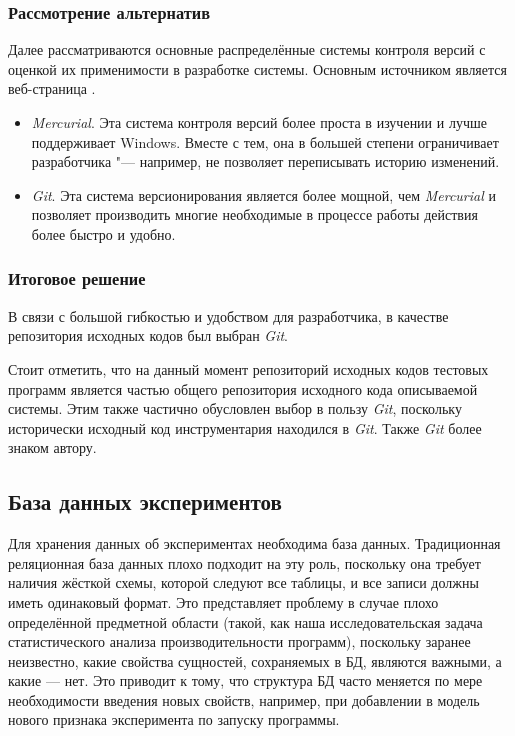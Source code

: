 \subsubsection{Рассмотрение альтернатив}
Далее рассматриваются основные распределённые системы контроля версий с оценкой их применимости в разработке системы. Основным источником является веб-страница \cite{git-vs-hg}.
\begin{itemize}
    \item \textit{Mercurial}. Эта система контроля версий более проста в изучении и лучше поддерживает Windows. Вместе с тем, она в большей степени ограничивает разработчика "--- например, не позволяет переписывать историю изменений.
    \item \textit{Git}. Эта система версионирования является более мощной, чем \textit{Mercurial} и позволяет производить многие необходимые в процессе работы действия более быстро и удобно.
\end{itemize}


\subsubsection{Итоговое решение}
В связи с большой гибкостью и удобством для разработчика, в качестве репозитория исходных кодов был выбран \textit{Git}.

Стоит отметить, что на данный момент репозиторий исходных кодов тестовых программ является частью общего репозитория исходного кода описываемой системы. Этим также частично обусловлен выбор в пользу \textit{Git}, поскольку исторически исходный код инструментария находился в \textit{Git}. Также \textit{Git} более знаком автору.


\subsection{База данных экспериментов}
Для хранения данных об экспериментах необходима база данных. Традиционная реляционная база данных плохо подходит на эту роль, поскольку она требует наличия жёсткой схемы, которой следуют все таблицы, и все записи должны иметь одинаковый формат. Это представляет проблему в случае плохо определённой предметной области (такой, как наша исследовательская задача статистического анализа производительности программ), поскольку заранее неизвестно, какие свойства сущностей, сохраняемых в БД, являются важными, а какие --- нет. Это приводит к тому, что структура БД часто меняется по мере необходимости введения новых свойств, например, при добавлении в модель нового признака эксперимента по запуску программы.

